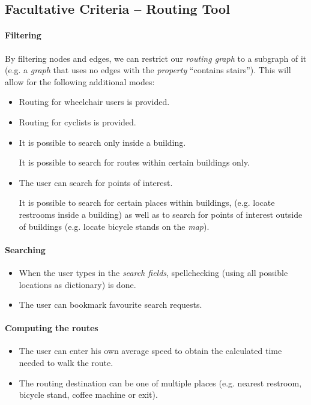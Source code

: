 \subsection{Facultative Criteria -- Routing Tool}

\paragraph{Filtering}
By filtering nodes and edges, we can restrict our \textit{routing graph} to a subgraph of it (e.g. a \textit{graph} that uses no edges with the \textit{property} ``contains stairs''). This will allow for the following additional modes:

\begin{itemize}
	\item Routing for wheelchair users is provided. %
	\item Routing for cyclists is provided.
	\item It is possible to search only inside a building.
		\begin{addmargin}[7mm]{0mm}
			It is possible to search for routes within certain buildings only.
		\end{addmargin}
	\item The user can search for points of interest.
		\begin{addmargin}[7mm]{0mm}
			It is possible to search for certain places within buildings, (e.g. locate restrooms inside a building)
			as well as to search for points of interest outside of buildings (e.g. locate bicycle stands on the \textit{map}).
		\end{addmargin}
\end{itemize}

\paragraph{Searching}
\begin{itemize}
	\item When the user types in the \textit{search fields}, spellchecking (using all possible locations as dictionary) is done. %
	\item The user can bookmark favourite search requests.
\end{itemize}

\paragraph{Computing the routes}
\begin{itemize}
	\item The user can enter his own average speed to obtain the calculated time needed to walk the route.
	\item The routing destination can be one of multiple places (e.g. nearest restroom, bicycle stand, coffee machine or exit).
\end{itemize}

